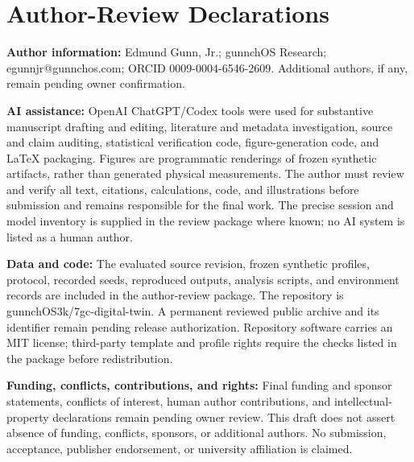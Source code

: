 \section*{Author-Review Declarations}
\textbf{Author information:} Edmund Gunn, Jr.; gunnchOS Research; egunnjr@gunnchos.com; ORCID 0009-0004-6546-2609. Additional authors, if any, remain pending owner confirmation.

\textbf{AI assistance:} OpenAI ChatGPT/Codex tools were used for substantive manuscript drafting and editing, literature and metadata investigation, source and claim auditing, statistical verification code, figure-generation code, and LaTeX packaging. Figures are programmatic renderings of frozen synthetic artifacts, rather than generated physical measurements. The author must review and verify all text, citations, calculations, code, and illustrations before submission and remains responsible for the final work. The precise session and model inventory is supplied in the review package where known; no AI system is listed as a human author.

\textbf{Data and code:} The evaluated source revision, frozen synthetic profiles, protocol, recorded seeds, reproduced outputs, analysis scripts, and environment records are included in the author-review package. The repository is gunnchOS3k/7gc-digital-twin. A permanent reviewed public archive and its identifier remain pending release authorization. Repository software carries an MIT license; third-party template and profile rights require the checks listed in the package before redistribution.

\textbf{Funding, conflicts, contributions, and rights:} Final funding and sponsor statements, conflicts of interest, human author contributions, and intellectual-property declarations remain pending owner review. This draft does not assert absence of funding, conflicts, sponsors, or additional authors. No submission, acceptance, publisher endorsement, or university affiliation is claimed.
